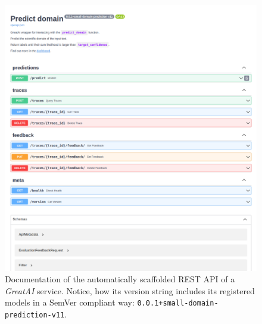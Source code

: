 \begin{figure}
    \centering
    \includegraphics[width=\linewidth]{figures/greatai-api.png}
    \captionsetup{width=.9\linewidth}
    \caption{Documentation of the automatically scaffolded REST API of a \textit{GreatAI} service. Notice, how its version string includes its registered models in a SemVer compliant way: \texttt{0.0.1+small-domain-prediction-v11}.}
    \label{fig:greatai-api}
\end{figure}
